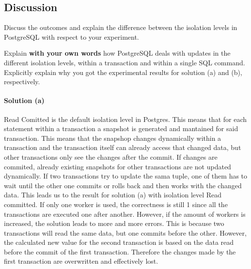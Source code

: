 \documentclass[11pt]{scrartcl}
\begin{document}
\subsection*{Discussion}

Discuss the outcomes and explain the difference between the isolation levels in PostgreSQL with respect to your experiment.

Explain \textbf{with your own words} how PostgreSQL deals with updates in the different isolation levels, within a transaction and within a single SQL command. Explicitly explain why you got the experimental results for solution (a) and (b), respectively.

\paragraph{Solution (a)}\mbox{}

Read Comitted is the default isolation level in Postgres. This means that for each statement within a transaction a snapshot is generated and mantained for said transaction. This means that the snapshop changes dynamically within a transaction and the transaction itself can already access that changed data, but other transactions only see the changes after the commit. If changes are commited, already existing snapshots for other transactions are not updated dynamically. If two transactions try to update the sama tuple, one of them has to wait until the other one commits or rolls back and then works with the changed data. This leads us to the result for solution (a) with isolation level Read committed. If only one worker is used, the correctness is still 1 since all the transactions are executed one after another. However, if the amount of workers is increased, the solution leads to more and more errors. This is because two transactions will read the same data, but one commits before the other. However, the calculated new value for the second transaction is based on the data read before the commit of the first transaction. Therefore the changes made by the first transaction are overwritten and effectively lost.
\end{document}
